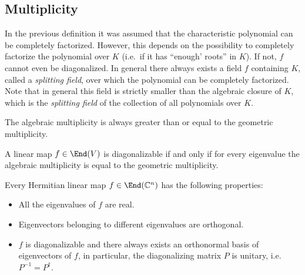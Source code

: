 \subsection{Multiplicity}

    \begin{remark}
        In the previous definition it was assumed that the characteristic polynomial can be completely factorized. However, this depends on the possibility to completely factorize the polynomial over $K$ (i.e.~if it has ``enough' roots'' in $K$). If not, $f$ cannot even be diagonalized. In general there always exists a field $f$ containing $K$, called a \textit{splitting field}, over which the polynomial can be completely factorized. Note that in general this field is strictly smaller than the algebraic closure of $K$, which is the \textit{splitting field} of the collection of all polynomials over $K$.
    \end{remark}

    \begin{property}
        The algebraic multiplicity is always greater than or equal to the geometric multiplicity.
    \end{property}
    \begin{theorem}\label{linalgebra:diagonalizable_multiplicity}
        A linear map $f\in\End(V)$ is diagonalizable if and only if for every eigenvalue the algebraic multiplicity is equal to the geometric multiplicity.
    \end{theorem}

    \begin{property}\label{linalgebra:diagonalizable_hermitian}
        Every Hermitian linear map $f\in\End(\mathbb{C}^n)$ has the following properties:
        \begin{itemize}
            \item All the eigenvalues of $f$ are real.
            \item Eigenvectors belonging to different eigenvalues are orthogonal.
            \item $f$ is diagonalizable and there always exists an orthonormal basis of eigenvectors of $f$, in particular, the diagonalizing matrix $P$ is unitary, i.e.~$P^{-1} = P^\dag$.
        \end{itemize}
    \end{property}

